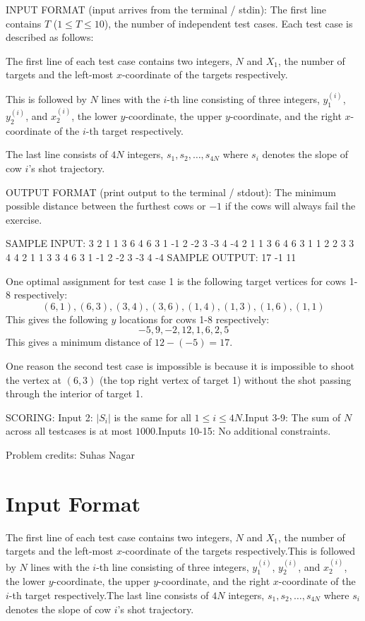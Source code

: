 \documentclass[12pt]{article}
\begin{document}
INPUT FORMAT (input arrives from the terminal / stdin):
The first line contains $T$ ($1 \leq T \leq 10$), the number of independent test
cases. Each test case is described as follows:

The first line of each test case contains two integers, $N$ and $X_1$, the
number of targets and the left-most $x$-coordinate of the targets respectively.

This is followed by $N$ lines with the $i$-th line consisting of three integers,
$y_1^{(i)}$, $y_2^{(i)}$, and $x_2^{(i)}$, the lower $y$-coordinate, the upper
$y$-coordinate, and the right $x$-coordinate of the $i$-th target respectively.

The last line consists of $4N$ integers, $s_1, s_2, \dots, s_{4N}$ where $s_i$
denotes the slope of cow $i$'s shot trajectory.

OUTPUT FORMAT (print output to the terminal / stdout):
The minimum possible distance between the furthest cows or $-1$ if the cows will
always fail the exercise.

SAMPLE INPUT:
3
2 1
1 3 6
4 6 3
1 -1 2 -2 3 -3 4 -4
2 1
1 3 6
4 6 3
1 1 2 2 3 3 4 4
2 1
1 3 3
4 6 3
1 -1 2 -2 3 -3 4 -4
SAMPLE OUTPUT: 
17
-1
11

One optimal assignment for test case 1 is the following target vertices for cows
1-8 respectively:
$$(6, 1), (6,3), (3,4), (3,6), (1,4), (1,3), (1,6), (1,1)$$
This gives the following $y$ locations for cows 1-8 respectively:
$$-5, 9, -2, 12, 1, 6, 2, 5$$
This gives a minimum distance of $12-(-5) = 17$.

One reason the second test case is impossible is because it is impossible to
shoot the vertex at $(6, 3)$ (the top right vertex of target 1) without the shot
passing through the interior of target 1.

SCORING:
Input 2: $|S_i|$ is the same for all $1 \leq i \leq 4N$.Input 3-9:
The sum of $N$ across all testcases is at most $1000$.Inputs 10-15: No
additional constraints.

Problem credits: Suhas Nagar



\section*{Input Format}
The first line of each test case contains two integers, $N$ and $X_1$, the
number of targets and the left-most $x$-coordinate of the targets respectively.This is followed by $N$ lines with the $i$-th line consisting of three integers,
$y_1^{(i)}$, $y_2^{(i)}$, and $x_2^{(i)}$, the lower $y$-coordinate, the upper
$y$-coordinate, and the right $x$-coordinate of the $i$-th target respectively.The last line consists of $4N$ integers, $s_1, s_2, \dots, s_{4N}$ where $s_i$
denotes the slope of cow $i$'s shot trajectory.
\end{document}
